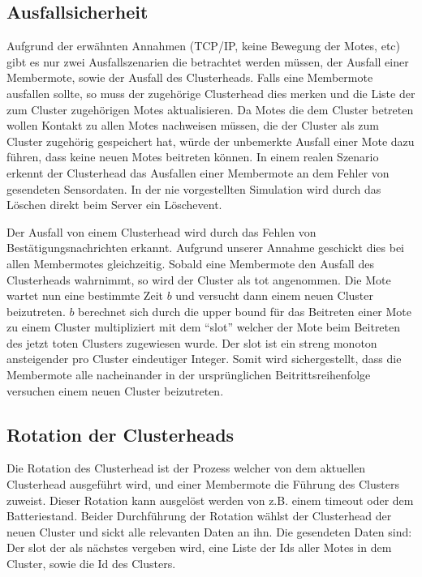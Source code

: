 \subsection{Ausfallsicherheit}
Aufgrund der erw\"ahnten Annahmen (TCP/IP, keine Bewegung der Motes, etc) gibt es nur zwei Ausfallszenarien die betrachtet werden m\"ussen, der Ausfall einer Membermote,  sowie der Ausfall des Clusterheads.
Falls eine Membermote ausfallen sollte, so muss der zugeh\"orige Clusterhead dies merken und die Liste der zum Cluster zugeh\"origen Motes aktualisieren.
Da Motes die dem Cluster betreten wollen Kontakt zu allen Motes nachweisen m\"ussen, die der Cluster als zum Cluster zugeh\"orig gespeichert hat, w\"urde der unbemerkte Ausfall einer Mote dazu f\"uhren, dass keine neuen Motes beitreten k\"onnen.
In einem realen Szenario erkennt der Clusterhead das Ausfallen einer Membermote an dem Fehler von gesendeten Sensordaten. In der nie vorgestellten Simulation wird durch das L\"oschen direkt beim Server ein L\"oschevent.

Der Ausfall von einem Clusterhead wird durch das Fehlen von Best\"atigungsnachrichten erkannt.
Aufgrund unserer Annahme geschickt dies bei allen Membermotes gleichzeitig.
Sobald eine Membermote den Ausfall des Clusterheads wahrnimmt, so wird der Cluster als tot angenommen.
Die Mote wartet nun eine bestimmte Zeit $b$ und versucht dann einem neuen Cluster beizutreten.
$b$ berechnet sich durch die upper bound f\"ur das Beitreten einer Mote zu einem Cluster multipliziert mit dem ``slot'' welcher der Mote beim Beitreten des jetzt toten Clusters zugewiesen wurde.
Der slot ist ein streng monoton ansteigender pro Cluster eindeutiger Integer.
Somit wird sichergestellt, dass die Membermote alle nacheinander in der urspr\"unglichen Beitrittsreihenfolge versuchen einem neuen Cluster beizutreten.

\subsection{Rotation der Clusterheads}
Die Rotation des Clusterhead ist der Prozess welcher von dem aktuellen Clusterhead ausgef\"uhrt wird, und einer Membermote die F\"uhrung des Clusters zuweist.
Dieser Rotation kann ausgel\"ost werden von z.B. einem timeout oder dem Batteriestand.
Beider Durchf\"uhrung der Rotation w\"ahlst der Clusterhead der neuen Cluster und sickt alle relevanten Daten an ihn.
Die gesendeten Daten sind:
Der slot der als n\"achstes vergeben wird, eine Liste der Ids aller Motes in dem Cluster, sowie die Id des Clusters.
